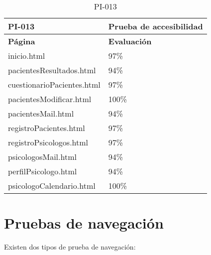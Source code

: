 \begin{table}[htpb]
\centering
\begin{tabularx}{\textwidth}{|X|X|}
\hline
\rowcolor[gray]{0.9}\textbf{PI-013}            & \textbf{Prueba de accesibilidad} \\ \hline
\textbf{Página}            & \textbf{Evaluación}              \\ \hline
inicio.html                & 97\%                             \\ \hline
pacientesResultados.html   & 94\%                             \\ \hline
cuestionarioPacientes.html & 97\%                             \\ \hline
pacientesModificar.html    & 100\%                            \\ \hline
pacientesMail.html         & 94\%                             \\ \hline
registroPacientes.html     & 97\%                             \\ \hline
registroPsicologos.html    & 97\%                             \\ \hline
psicologosMail.html        & 94\%                             \\ \hline
perfilPsicologo.html       & 94\%                             \\ \hline
psicologoCalendario.html   & 100\%                            \\ \hline
\end{tabularx}
\caption{PI-013}
\end{table}


\section{Pruebas de navegación}


Existen dos tipos de prueba de navegación:

